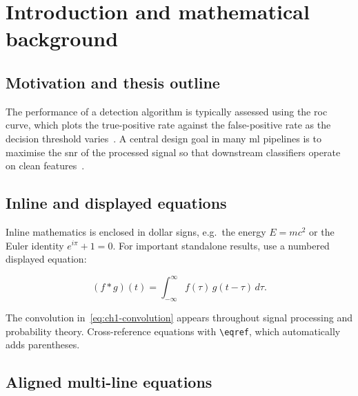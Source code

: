 %

\chapter{Introduction and mathematical background}
\label{ch1/ch1}
\clearpage

\section{Motivation and thesis outline}

\lipsum[1]

The performance of a detection algorithm is typically assessed using
the \ac{roc} curve, which plots the true-positive rate against the
false-positive rate as the decision threshold varies~\cite{bishop2006}.
A central design goal in many \ac{ml} pipelines is to maximise the
\ac{snr} of the processed signal so that downstream classifiers
operate on clean features~\cite{shannon1948}.

\lipsum[2]

\section{Inline and displayed equations}

Inline mathematics is enclosed in dollar signs, e.g.\ the energy
$E = mc^{2}$ or the Euler identity $e^{i\pi} + 1 = 0$.
For important standalone results, use a numbered displayed equation:

\begin{equation}
  (f * g)(t) = \int_{-\infty}^{\infty} f(\tau)\, g(t - \tau)\, d\tau.
  \label{eq:ch1-convolution}
\end{equation}

The convolution in~\eqref{eq:ch1-convolution} appears throughout
signal processing and probability theory.
Cross-reference equations with \verb|\eqref|, which automatically adds
parentheses.

\section{Aligned multi-line equations}

